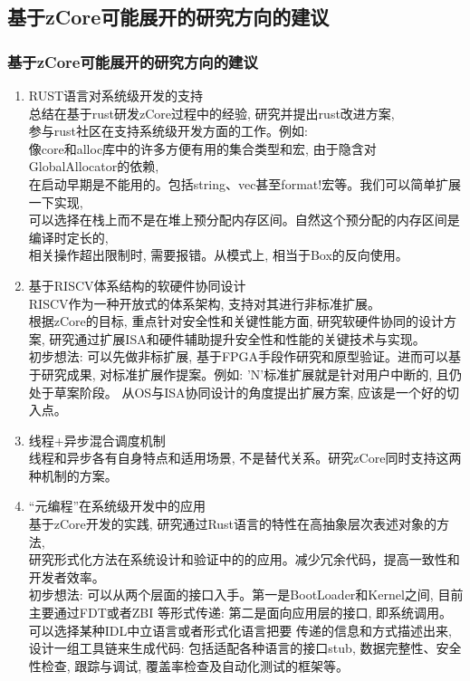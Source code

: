\documentclass[
8pt, %
]{beamer}
\begin{document}
	\subsection{基于zCore可能展开的研究方向的建议}

	\begin{frame}
		\frametitle{基于zCore可能展开的研究方向的建议}
		\begin{enumerate}
			\item RUST语言对系统级开发的支持\\
			总结在基于rust研发zCore过程中的经验, 研究并提出rust改进方案,\\
            参与rust社区在支持系统级开发方面的工作。例如: \\
            像core和alloc库中的许多方便有用的集合类型和宏, 由于隐含对GlobalAllocator的依赖,\\
            在启动早期是不能用的。包括string、vec甚至format!宏等。我们可以简单扩展一下实现,\\
            可以选择在栈上而不是在堆上预分配内存区间。自然这个预分配的内存区间是编译时定长的,\\
            相关操作超出限制时, 需要报错。从模式上, 相当于Box的反向使用。
			\item 基于RISCV体系结构的软硬件协同设计\\
			RISCV作为一种开放式的体系架构, 支持对其进行非标准扩展。\\
			根据zCore的目标, 重点针对安全性和关键性能方面, 研究软硬件协同的设计方案,
            研究通过扩展ISA和硬件辅助提升安全性和性能的关键技术与实现。\\
            初步想法: 可以先做非标扩展, 基于FPGA手段作研究和原型验证。进而可以基于研究成果,
            对标准扩展作提案。例如: 'N'标准扩展就是针对用户中断的, 且仍处于草案阶段。
            从OS与ISA协同设计的角度提出扩展方案, 应该是一个好的切入点。
			\item 线程+异步混合调度机制\\
			线程和异步各有自身特点和适用场景, 不是替代关系。研究zCore同时支持这两种机制的方案。
			\item “元编程”在系统级开发中的应用\\
			基于zCore开发的实践, 研究通过Rust语言的特性在高抽象层次表述对象的方法,\\
            研究形式化方法在系统设计和验证中的的应用。减少冗余代码，提高一致性和开发者效率。\\
            初步想法: 可以从两个层面的接口入手。第一是BootLoader和Kernel之间, 目前主要通过FDT或者ZBI
            等形式传递: 第二是面向应用层的接口, 即系统调用。可以选择某种IDL中立语言或者形式化语言把要
            传递的信息和方式描述出来, 设计一组工具链来生成代码: 包括适配各种语言的接口stub,
            数据完整性、安全性检查, 跟踪与调试, 覆盖率检查及自动化测试的框架等。
		\end{enumerate}
	\end{frame}
\end{document}
